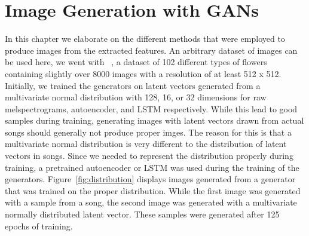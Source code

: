 \chapter{Image Generation with GANs}\label{ch:generation}

    In this chapter we elaborate on the different methods that were employed to produce images from the extracted features. An arbitrary dataset of images can be used here, we went with ~\cite{102flower}, a dataset of 102 different types of flowers containing slightly over 8000 images with a resolution of at least 512 x 512.\\
    Initially, we trained the generators on latent vectors generated from a multivariate normal distribution with 128, 16, or 32 dimensions for raw melspectrograms, autoencoder, and LSTM respectively. While this lead to good samples during training, generating images with latent vectors drawn from actual songs should generally not produce proper imges. The reason for this is that a multivariate normal distribution is very different to the distribution of latent vectors in songs. Since we needed to represent the distribution properly during training, a pretrained autoencoder or LSTM was used during the training of the generators. Figure~\ref{fig:distribution} displays images generated from a generator that was trained on the proper distribution. While the first image was generated with a sample from a song, the second image was generated with a multivariate normally distributed latent vector. These samples were generated after 125 epochs of training.

